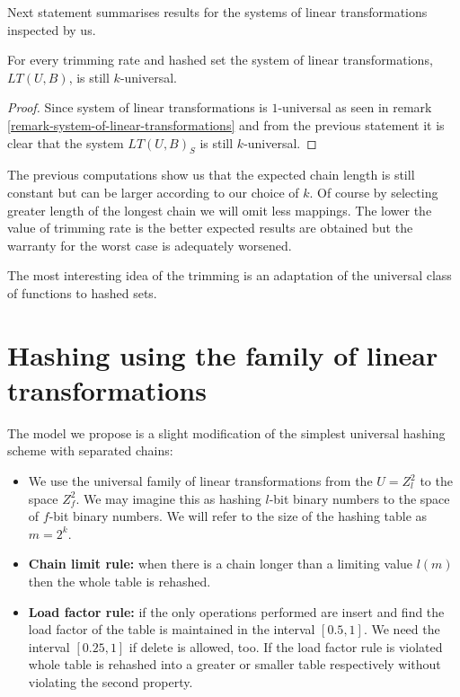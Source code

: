 Next statement summarises results for the systems of linear transformations inspected by us.

\begin{corollary}
\label{corollary-trimming-linear}
For every trimming rate and hashed set the system of linear transformations, $LT(U, B)$, is still $k$-universal.
\end{corollary}
\begin{proof}
Since system of linear transformations is $1$-universal as seen in remark \ref{remark-system-of-linear-transformations} and from the previous statement it is clear that the system $LT(U, B)_S$ is still $k$-universal.
\end{proof}

The previous computations show us that the expected chain length is still constant but can be larger according to our choice of $k$. Of course by selecting greater length of the longest chain we will omit less mappings. The lower the value of trimming rate is the better expected results are obtained but the warranty for the worst case is adequately worsened.

The most interesting idea of the trimming is an adaptation of the universal class of functions to hashed sets.

\section{Hashing using the family of linear transformations}

The model we propose is a slight modification of the simplest universal hashing scheme with separated chains:
\begin{itemize}
\item We use the universal family of linear transformations from the $U = Z^2_l$ to the space $Z^2_f$. We may imagine this as hashing $l$-bit binary numbers to the space of $f$-bit binary numbers. We will refer to the size of the hashing table as $m = 2^k$.
\item \textbf{Chain limit rule:} when there is a chain longer than a limiting value $l(m)$ then the whole table is rehashed.
\item \textbf{Load factor rule:} if the only operations performed are insert and find the load factor of the table is maintained in the interval $\left[0.5, 1\right]$. We need the interval $\left[0.25, 1\right]$ if delete is allowed, too. If the load factor rule is violated whole table is rehashed into a greater or smaller table respectively without violating the second property.
\end{itemize}

